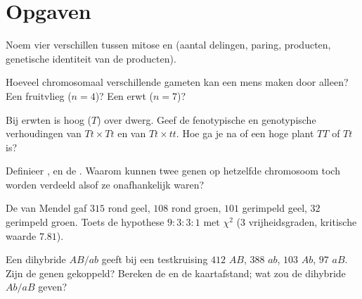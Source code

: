 \section{Opgaven}

\begin{exercise}[$\star$]\label{exo:b2:meiosis-heredity:1}
Noem vier verschillen tussen mitose en  (aantal delingen, paring,
producten, genetische identiteit van de producten).
\end{exercise}

\begin{exercise}[$\star$]\label{exo:b2:meiosis-heredity:2}
Hoeveel chromosomaal verschillende gameten kan een mens maken door
 alleen? Een fruitvlieg ($n = 4$)? Een erwt ($n =
7$)?
\end{exercise}

\begin{exercise}[$\star$]\label{exo:b2:meiosis-heredity:3}
Bij erwten is hoog ($T$)  over dwerg. Geef de fenotypische en
genotypische verhoudingen van $Tt \times Tt$ en van $Tt \times tt$. Hoe
ga je na of een hoge plant $TT$ of $Tt$ is?
\end{exercise}

\begin{exercise}[$\star$]\label{exo:b2:meiosis-heredity:4}
Definieer ,  en de . Waarom
kunnen twee genen op hetzelfde chromosoom toch worden verdeeld alsof ze
onafhankelijk waren?
\end{exercise}

\begin{exercise}[$\star\star$]\label{exo:b2:meiosis-heredity:5}
De  van Mendel gaf $315$ rond geel, $108$ rond groen,
$101$ gerimpeld geel, $32$ gerimpeld groen. Toets de hypothese $9 : 3 : 3 :
1$ met $\chi^2$ (3 vrijheidsgraden, kritische waarde
$7.81$).
\end{exercise}

\begin{exercise}[$\star\star$]\label{exo:b2:meiosis-heredity:6}
Een dihybride $AB/ab$ geeft bij een testkruising $412$ $AB$, $388$ $ab$, $103$
$Ab$, $97$ $aB$. Zijn de genen gekoppeld? Bereken de 
en de kaartafstand; wat zou de dihybride $Ab/aB$ geven?
\end{exercise}

